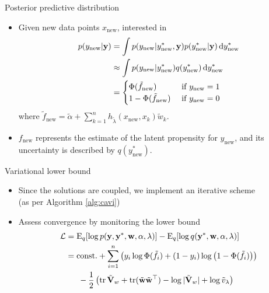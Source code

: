 \begin{frame}{Posterior predictive distribution}
  \begin{itemize}\setlength\itemsep{1em}
    \item Given new data points $x_{\text{new}}$, interested in
    \begin{align*}
      p(y_{\text{new}}|{\mathbf y}) &= \int p(y_{\text{new}} | y^*_{\text{new}}, {\mathbf y}) p (y^*_{\text{new}} | {\mathbf y}) \, \text{d} y^*_{\text{new}} \\
      &\approx \int p(y_{\text{new}} | y^*_{\text{new}}) q (y^*_{\text{new}}) \, \text{d} y^*_{\text{new}} \\
      &= \begin{cases}
        \Phi(\tilde f_{\text{new}}) & \text{ if } y_{\text{new}} = 1 \\
        1 - \Phi(\tilde f_{\text{new}}) & \text{ if } y_{\text{new}} = 0 \\
      \end{cases}
    \end{align*}
    where $\tilde f_{\text{new}} = \tilde\alpha + {\sum_{k=1}^n} h_{\tilde\lambda}(x_{\text{new}}, x_k)\tilde w_k$.
    \item $f_{\text{new}}$ represents the estimate of the latent propensity for $y_{\text{new}}$, and its uncertainty is described by $q(y_{\text{new}}^*)$.
  \end{itemize}
\end{frame}

\begin{frame}{Variational lower bound}
  \begin{itemize}\setlength\itemsep{1em}
    \item Since the solutions are coupled, we implement an iterative scheme \\ (as per Algorithm \ref{alg:cavi})
    \item Assess convergence by monitoring the lower bound
    \begin{align*}
      {\mathcal L} 
      &= \operatorname{E}_q[\log p({\mathbf y},{\mathbf y}^*,{\mathbf w},\alpha,\lambda)] - \operatorname{E}_q[\log q({\mathbf y}^*,{\mathbf w},\alpha,\lambda)] \\
      &= \text{const.} + \sum_{i=1}^n \left(y_i \log \Phi(\tilde f_i) + (1-y_i) \log \big(1 - \Phi(\tilde f_i)\big)\right) \\
      &\phantom{==}-\frac{1}{2} \left( \operatorname{tr}\tilde{{\mathbf V}}_w + \operatorname{tr} (\tilde{{\mathbf w}}\tilde{{\mathbf w}}^\top) - \log \vert \tilde{{\mathbf V}}_w \vert + \log \tilde v_\lambda \right) 
    \end{align*}
  \end{itemize}
\end{frame}











